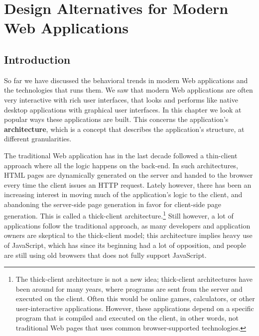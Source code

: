 





\chapter {Design Alternatives for Modern Web Applications}
\section{Introduction}
So far we have discussed the behavioral trends in modern Web applications and the technologies that runs them. We saw that modern Web applications are often very interactive with rich user interfaces, that looks and performs like native desktop applications with graphical user interfaces. In this chapter we look at popular ways these applications are built. This concerns the application's \textbf{architecture}, which is a concept that describes the application's structure, at different granularities. 

The traditional Web application has in the last decade followed a thin-client approach where all the logic happens on the back-end. In such architectures, HTML pages are dynamically generated on the server and handed to the browser every time the client issues an HTTP request. Lately however, there has been an increasing interest in moving much of the application's logic to the client, and abandoning the server-side page generation in favor for client-side page generation. This is called a thick-client architecture.\footnote{The thick-client architecture is not a new idea; thick-client architectures have been around for many years, where programs are sent from the server and executed on the client. Often this would be online games, calculators, or other user-interactive applications. However, these applications depend on a specific program that is compiled and executed on the client, in other words, not traditional Web pages that uses common browser-supported technologies.} Still however, a lot of applications follow the traditional approach, as many developers and application owners are skeptical to the thick-client model; this architecture implies heavy use of JavaScript, which has since its beginning had a lot of opposition, and people are still using old browsers that does not fully support JavaScript\cite{ie6use}.

